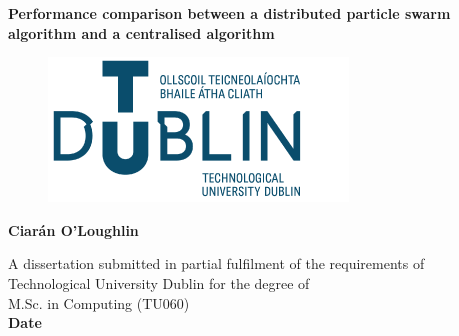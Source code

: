 \documentclass[oneside,12pt]{book}
\begin{document}
\begin{titlepage}
    \begin{center}
        \vspace*{1.5cm}
        \Huge
        \textbf{Performance comparison between a distributed particle swarm algorithm and a centralised algorithm}
        
        \vspace{0.5cm}
        \begin{figure}[H]
    	\centering
    	\hspace{7mm} \includegraphics[scale=0.5]{TU_logo}
        \end{figure}
        
        \vspace{1.5cm}
        
        \textbf{Ciarán O'Loughlin}
        
        \vfill
       \large
        A dissertation submitted in partial fulfilment of the requirements of\\
        Technological University Dublin for the degree of\\
	M.Sc. in Computing (TU060)\\
       \vspace{0.5cm}
        \textbf{Date}
        \vspace{0.8cm}
 
    \end{center}
\end{titlepage}

\pagestyle{fancy}
\fancyhf{}
\fancyfoot[CE,CO]{\thepage}
\renewcommand{\headrulewidth}{0pt}




\end{document}
